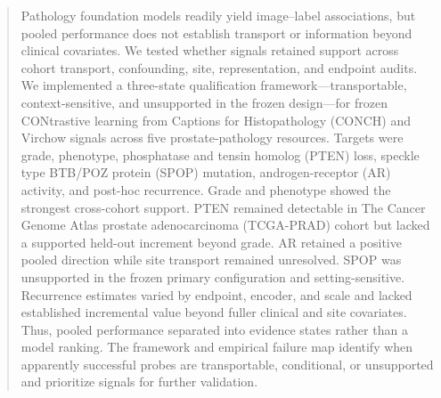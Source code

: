 \begin{abstract}
Pathology foundation models readily yield image--label associations, but pooled performance
does not establish transport or information beyond clinical covariates. We tested whether
signals retained support across cohort transport, confounding, site, representation, and
endpoint audits. We implemented a three-state qualification framework---transportable,
context-sensitive, and unsupported in the frozen design---for frozen CONtrastive learning
from Captions for Histopathology (CONCH) and Virchow signals across five prostate-pathology
resources. Targets were grade, phenotype, phosphatase and tensin homolog (PTEN) loss,
speckle type BTB/POZ protein (SPOP) mutation, androgen-receptor (AR) activity, and post-hoc
recurrence. Grade and phenotype showed the strongest cross-cohort support. PTEN remained
detectable in The Cancer Genome Atlas prostate adenocarcinoma (TCGA-PRAD) cohort but lacked
a supported held-out increment beyond grade. AR retained a positive pooled direction while
site transport remained unresolved. SPOP was unsupported in the frozen primary
configuration and setting-sensitive. Recurrence estimates varied by endpoint, encoder, and
scale and lacked established incremental value beyond fuller clinical and site covariates.
Thus, pooled performance separated into evidence states rather than a model ranking. The
framework and empirical failure map identify when apparently successful probes are
transportable, conditional, or unsupported and prioritize signals for further validation.
\end{abstract}
